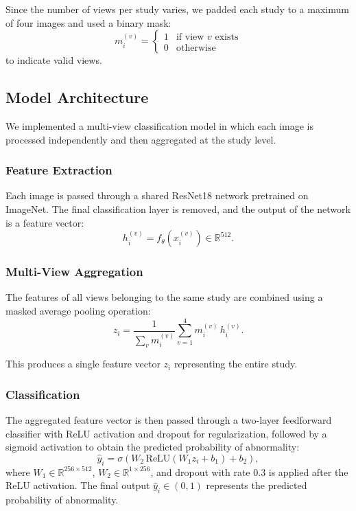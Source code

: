\documentclass[conference]{IEEEtran}
\begin{document}
Since the number of views per study varies, we padded each study to a maximum of four images and used a binary mask:
\begin{equation}
m_i^{(v)} =
\begin{cases}
1 & \text{if view } v \text{ exists} \\
0 & \text{otherwise}
\end{cases}
\end{equation}
to indicate valid views.

\subsection{Model Architecture}

We implemented a multi-view classification model in which each image is processed independently and then aggregated at the study level.

\subsubsection{Feature Extraction}

Each image is passed through a shared ResNet18 network pretrained on ImageNet\cite{he_deep_2016}. The final classification layer is removed, and the output of the network is a feature vector:
\begin{equation}
h_i^{(v)} = f_{\theta}(x_i^{(v)}) \in \mathbb{R}^{512}.
\end{equation}

\subsubsection{Multi-View Aggregation}

The features of all views belonging to the same study are combined using a masked average pooling operation:
\begin{equation}
z_i = \frac{1}{\sum_{v} m_i^{(v)}} \sum_{v=1}^{4} m_i^{(v)} \, h_i^{(v)}.
\end{equation}

This produces a single feature vector $z_i$ representing the entire study.

\subsubsection{Classification}

The aggregated feature vector is then passed through a two-layer feedforward classifier with ReLU activation and dropout for regularization, followed by a sigmoid activation to obtain the predicted probability of abnormality:
\begin{equation}
\hat{y}_i = \sigma(W_2 \, \text{ReLU}(W_1 z_i + b_1) + b_2),
\end{equation}
where $W_1 \in \mathbb{R}^{256 \times 512}$, $W_2 \in \mathbb{R}^{1 \times 256}$, and dropout with rate 0.3 is applied after the ReLU activation. The final output $\hat{y}_i \in (0,1)$ represents the predicted probability of abnormality.
\end{document}
